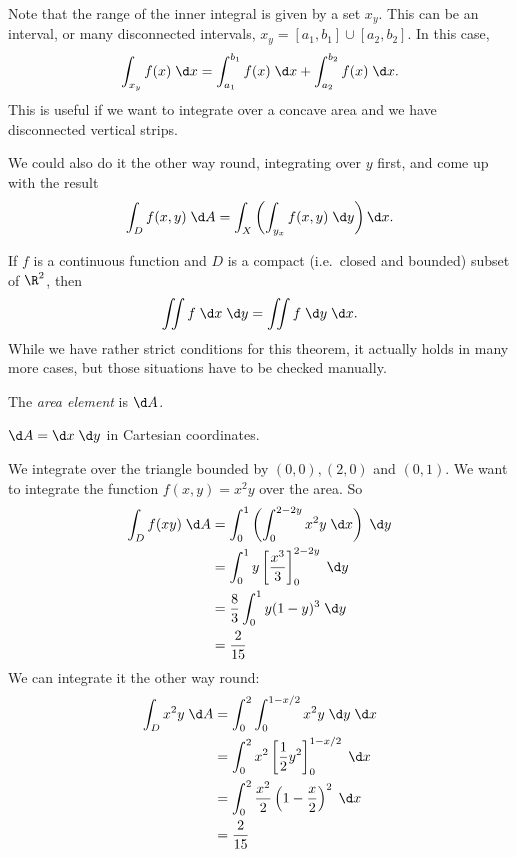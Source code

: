 \documentclass[a4paper]{article}
\begin{document}
Note that the range of the inner integral is given by a set $x_y$. This can be an interval, or many disconnected intervals, $x_y = [a_1, b_1]\cup [a_2, b_2]$. In this case,
\[
  \int_{x_y} f(x)\; \d x = \int_{a_1}^{b_1} f(x) \;\d x + \int_{a_2}^{b_2}f(x)\;\d x.
\]
This is useful if we want to integrate over a concave area and we have disconnected vertical strips.
\begin{center}
\end{center}
We could also do it the other way round, integrating over $y$ first, and come up with the result
\[
  \int_D f(x, y)\; \d A = \int_X\left(\int_{y_x}f(x, y)\; \d y\right) \d x.
\]
\begin{thm}
  If $f$ is a continuous function and $D$ is a compact (i.e.\ closed and bounded) subset of $\R^2$, then
  \[
    \iint f\;\d x\;\d y = \iint f\;\d y\;\d x.
  \]
  While we have rather strict conditions for this theorem, it actually holds in many more cases, but those situations have to be checked manually.
\end{thm}
\begin{defi}
  The \emph{area element} is $\d A$.
\end{defi}

\begin{prop}
  $\d A = \d x\;\d y$ in Cartesian coordinates.
\end{prop}

\begin{eg}
  We integrate over the triangle bounded by $(0, 0), (2, 0)$ and $(0, 1)$. We want to integrate the function $f(x, y) = x^2y$ over the area. So
  \begin{align*}
    \int _D f(x y)\;\d A &= \int_0^1 \left(\int_0^{2 - 2y}x^2y \;\d x\right)\; \d y\\
    &= \int_0^1 y\left[\frac{x^3}{3}\right]^{2 - 2y}_0 \;\d y\\
    &= \frac{8}{3}\int_0^1 y(1 - y)^3\;\d y\\
    &= \frac{2}{15}
  \end{align*}
  We can integrate it the other way round:
  \begin{align*}
    \int_D x^2 y\;\d A &= \int_0^2 \int_0^{1 - x/2}x^2y \;\d y\;\d x\\
    &= \int_0^2 x^2\left[\frac{1}{2}y^2\right]_0^{1 - x/2}\;\d x\\
    &= \int_0^2 \frac{x^2}{2} \left(1 - \frac{x}{2}\right)^2 \;\d x\\
    &= \frac{2}{15}
  \end{align*}
\end{eg}
\end{document}

